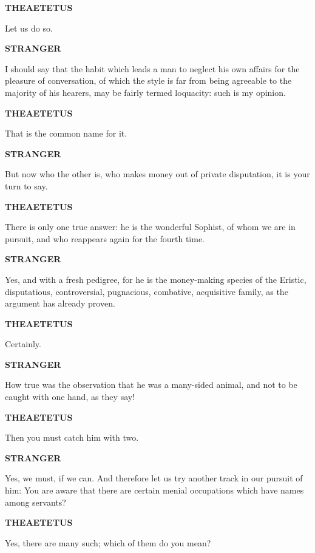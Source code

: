 \documentclass[11pt,letter]{article}
\begin{document}
\par \textbf{THEAETETUS}
\par   Let us do so.

\par \textbf{STRANGER}
\par   I should say that the habit which leads a man to neglect his own affairs for the pleasure of conversation, of which the style is far from being agreeable to the majority of his hearers, may be fairly termed loquacity:  such is my opinion.

\par \textbf{THEAETETUS}
\par   That is the common name for it.

\par \textbf{STRANGER}
\par   But now who the other is, who makes money out of private disputation, it is your turn to say.

\par \textbf{THEAETETUS}
\par   There is only one true answer:  he is the wonderful Sophist, of whom we are in pursuit, and who reappears again for the fourth time.

\par \textbf{STRANGER}
\par   Yes, and with a fresh pedigree, for he is the money-making species of the Eristic, disputatious, controversial, pugnacious, combative, acquisitive family, as the argument has already proven.

\par \textbf{THEAETETUS}
\par   Certainly.

\par \textbf{STRANGER}
\par   How true was the observation that he was a many-sided animal, and not to be caught with one hand, as they say!

\par \textbf{THEAETETUS}
\par   Then you must catch him with two.

\par \textbf{STRANGER}
\par   Yes, we must, if we can. And therefore let us try another track in our pursuit of him:  You are aware that there are certain menial occupations which have names among servants?

\par \textbf{THEAETETUS}
\par   Yes, there are many such; which of them do you mean?
\end{document}
